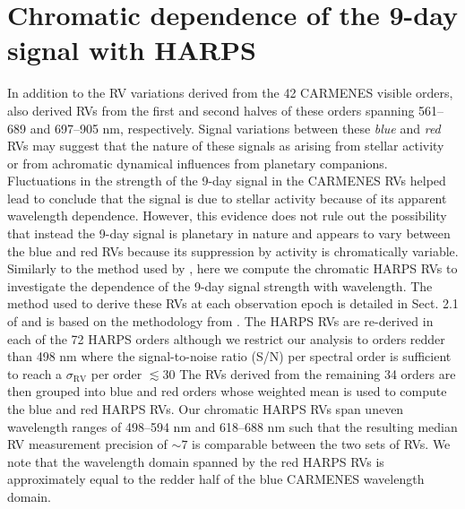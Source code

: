 \section{Chromatic dependence of the 9-day signal with HARPS} \label{k2182sect:act}
In addition to the RV variations derived from the 42 CARMENES visible orders,  also derived RVs from
the first and second halves of these orders spanning 561--689 and 697--905 nm, respectively. Signal variations between
these \emph{blue} and \emph{red} RVs may suggest that the nature of these signals as arising from stellar activity or
from achromatic dynamical influences from planetary companions. 
Fluctuations in the strength of the 9-day signal in the CARMENES RVs helped lead 
to conclude that the signal is due to stellar activity because of its apparent wavelength dependence. However, this
evidence does not rule out the possibility that instead the 9-day signal is planetary in nature and appears to vary
between the blue and red RVs because its suppression by activity is chromatically variable. \\

Similarly to the method used by , here we compute the chromatic HARPS RVs to investigate the dependence of the
9-day signal strength with wavelength. The method used to derive these RVs at each observation epoch is detailed
in Sect. 2.1 of  and is based on the methodology from \cite{astudillodefru15}. 
The HARPS RVs are re-derived in each of the 72 HARPS orders although we restrict our analysis to
orders redder than 498 nm where the signal-to-noise ratio (S/N) per spectral order is sufficient to reach a
$\sigma_{\text{RV}}$ per order $\lesssim 30$  The RVs derived from the remaining 34 orders are then grouped into
blue and red orders whose weighted mean is used to compute the blue and red HARPS RVs. Our chromatic HARPS RVs
span uneven wavelength ranges of 498--594 nm and 618--688 nm such that the resulting median RV measurement precision of
$\sim 7$ \mps{} is comparable between the two sets of RVs. We note that the wavelength domain spanned by the red HARPS RVs
is approximately equal to the redder half of the blue CARMENES wavelength domain. \\

